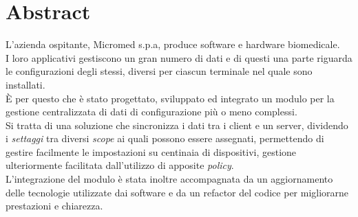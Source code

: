 \documentclass[\main/main.tex]{subfiles}
\begin{document}
\chapter*{Abstract}

L'azienda ospitante, Micromed s.p.a, produce software e hardware biomedicale.\\
I loro applicativi gestiscono un gran numero di dati e di questi una parte riguarda le configurazioni degli stessi, diversi per ciascun terminale nel quale sono installati.\\
È per questo che è stato progettato, sviluppato ed integrato un modulo per la gestione centralizzata di dati di configurazione più o meno complessi.\\
Si tratta di una soluzione che sincronizza i dati tra i client e un server, dividendo i \textit{settaggi} tra diversi \textit{scope} ai quali possono essere assegnati, permettendo di gestire facilmente le impostazioni su centinaia di dispositivi, gestione ulteriormente facilitata dall'utilizzo di apposite \textit{policy}.\\
L'integrazione del modulo è stata inoltre accompagnata da un aggiornamento delle tecnologie utilizzate dai software e da un refactor del codice per migliorarne prestazioni e chiarezza.
\end{document}
